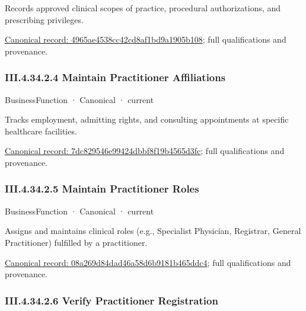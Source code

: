 Records approved clinical scopes of practice, procedural authorizations, and prescribing privileges.


{\footnotesize \href{../../../../continuum/business/business-function/4965ae4538cc42cd8af1bd9a1905b108.md}{Canonical record: 4965ae4538cc42cd8af1bd9a1905b108}; full qualifications and provenance.}\par
\subsubsection*{III.4.34.2.4 Maintain Practitioner Affiliations}
\label{navigation:III.4.34.2.4}

\label{element:7dc829546e99424dbbf8f19b4565d3fc}
{\small BusinessFunction · Canonical · current}\par

Tracks employment, admitting rights, and consulting appointments at specific healthcare facilities.


{\footnotesize \href{../../../../continuum/business/business-function/7dc829546e99424dbbf8f19b4565d3fc.md}{Canonical record: 7dc829546e99424dbbf8f19b4565d3fc}; full qualifications and provenance.}\par
\subsubsection*{III.4.34.2.5 Maintain Practitioner Roles}
\label{navigation:III.4.34.2.5}

\label{element:08a269d84dad46a58d6b9181b465ddc4}
{\small BusinessFunction · Canonical · current}\par

Assigns and maintains clinical roles (e.g., Specialist Physician, Registrar, General Practitioner) fulfilled by a practitioner.


{\footnotesize \href{../../../../continuum/business/business-function/08a269d84dad46a58d6b9181b465ddc4.md}{Canonical record: 08a269d84dad46a58d6b9181b465ddc4}; full qualifications and provenance.}\par
\subsubsection*{III.4.34.2.6 Verify Practitioner Registration}
\label{navigation:III.4.34.2.6}

